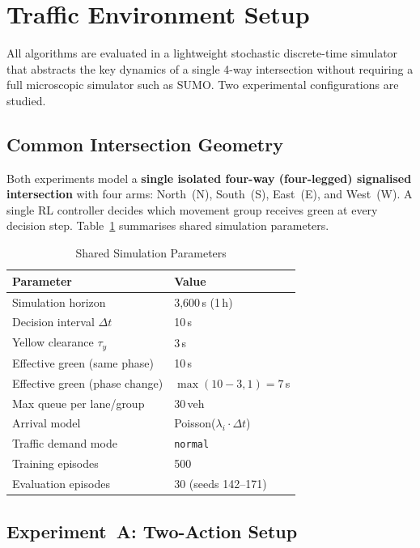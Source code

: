 \documentclass[conference]{IEEEtran}
\begin{document}
\section{Traffic Environment Setup}

All algorithms are evaluated in a lightweight stochastic
discrete-time simulator that abstracts the key dynamics of a single
4-way intersection without requiring a full microscopic simulator
such as SUMO. Two experimental configurations are studied.

\subsection{Common Intersection Geometry}

Both experiments model a \textbf{single isolated four-way
(four-legged) signalised intersection} with four arms: North~(N),
South~(S), East~(E), and West~(W). A single RL controller decides
which movement group receives green at every decision step.
Table~\ref{tab:common} summarises shared simulation parameters.

\begin{table}[h]
\centering
\caption{Shared Simulation Parameters}
\label{tab:common}
\begin{tabular}{ll}
\toprule
Parameter & Value \\
\midrule
Simulation horizon & 3{,}600\,s (1\,h) \\
Decision interval $\Delta t$ & 10\,s \\
Yellow clearance $\tau_y$ & 3\,s \\
Effective green (same phase) & 10\,s \\
Effective green (phase change) & $\max(10-3,1) = 7$\,s \\
Max queue per lane/group & 30\,veh \\
Arrival model & Poisson($\lambda_i \cdot \Delta t$) \\
Traffic demand mode & \texttt{normal} \\
Training episodes & 500 \\
Evaluation episodes & 30 (seeds 142--171) \\
\bottomrule
\end{tabular}
\end{table}

\subsection{Experiment~A: Two-Action Setup}
\end{document}
